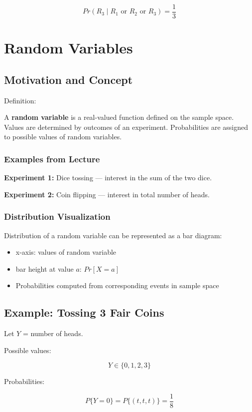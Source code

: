 \documentclass[12pt]{article}
\begin{document}
\[
Pr(R_3 \mid R_1 \text{ or } R_2 \text{ or } R_3) = \frac{1}{3}
\]

\section{Random Variables}

\subsection{Motivation and Concept}

Definition:

A \textbf{random variable} is a real-valued function defined on the sample space.  
Values are determined by outcomes of an experiment.  
Probabilities are assigned to possible values of random variables.

\subsubsection*{Examples from Lecture}

\textbf{Experiment 1:} Dice tossing — interest in the sum of the two dice.

\textbf{Experiment 2:} Coin flipping — interest in total number of heads.

\subsubsection*{Distribution Visualization}

Distribution of a random variable can be represented as a bar diagram:
\begin{itemize}
\item x-axis: values of random variable
\item bar height at value $a$: $Pr[X=a]$
\item Probabilities computed from corresponding events in sample space
\end{itemize}

\subsection{Example: Tossing 3 Fair Coins}

Let $Y$ = number of heads.

Possible values:

\[
Y \in \{0,1,2,3\}
\]

Probabilities:

\[
P\{Y=0\} = P\{(t,t,t)\} = \frac{1}{8}
\]
\end{document}
